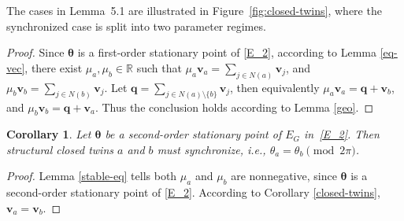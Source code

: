 \documentclass[11pt,reqno]{amsart}
\newtheorem{corollary}[theorem]{Corollary}
\theoremstyle{definition}
\begin{document}
The cases in Lemma~5.1 are illustrated in Figure~\ref{fig:closed-twins}, 
where the synchronized case is split into two parameter regimes.

\begin{proof}
Since $\boldsymbol{\theta}$ is a first-order stationary point of \eqref{E_2}, according to Lemma \ref{eq-vec}, there exist $\mu_a,\mu_b \in \mathbb R$ such that $\mu_a\mathbf{v}_a = \sum_{j\in N(a)} \mathbf{v}_j$, and $\mu_b\mathbf{v}_b=\sum_{j\in N(b)} \mathbf{v}_j$.
Let $\mathbf{q}=\sum_{j \in N(a)\setminus\{b\}} \mathbf{v}_j$, then equivalently $\mu_a\mathbf{v}_a = \mathbf{q} + \mathbf{v}_b$, and $\mu_b\mathbf{v}_b = \mathbf{q} + \mathbf{v}_a$.
Thus the conclusion holds according to Lemma \ref{geo}.
\end{proof}

\begin{corollary}\label{stable-closed-twins}
Let $\boldsymbol{\theta}$ be a second-order stationary point of $E_G$ in~\eqref{E_2}.
Then structural closed twins $a$ and $b$ must synchronize, i.e., $\theta_a=\theta_b \pmod{2\pi}$.
\end{corollary}

\begin{proof}
   Lemma \ref{stable-eq} tells both $\mu_a$ and $\mu_b$ are nonnegative, since $\boldsymbol{\theta}$ is a second-order stationary point of \eqref{E_2}. According to Corollary \ref{closed-twins}, $\mathbf{v}_a=\mathbf{v}_b$.
\end{proof}
\end{document}
